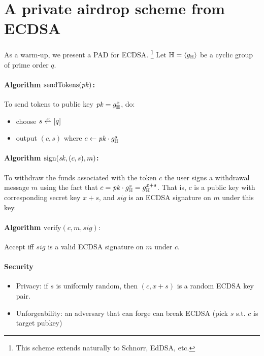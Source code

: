 \section{A private airdrop scheme from ECDSA}\label{sec:dsa}

As a warm-up, we present a PAD for ECDSA.
\unskip\footnote{This scheme extends naturally to Schnorr, EdDSA, etc.}
%
Let $\mathbb H = \langle g_\mathbb{H}\rangle$ be a cyclic group of prime order $q$.

\paragraph{Algorithm $\text{sendTokens}(\mathit{pk})$:} To send tokens to public key $\mathit{pk} = g_\mathbb{H}^x$, do:
\begin{itemize}
\item choose $s \rgets \range{q}$
\item output $(c, s)$ where $c \gets \mathit{pk}\cdot g_\mathbb{H}^s$
\end{itemize}


\paragraph{Algorithm $\text{sign}(\mathit{sk}, (c, s), m)$:}
To withdraw the funds associated with the token $c$ the user signs a
    withdrawal message $m$ using the fact that
$c = \mathit{pk}\cdot g_\mathbb{H}^s = g_\mathbb{H}^{x+s}$.
%
That is, $c$ is a public key with corresponding secret key $x + s$, and
    $\mathit{sig}$ is an ECDSA signature on $m$ under this key.

\paragraph{Algorithm $\text{verify}(c, m, \mathit{sig}):$}
Accept iff $\mathit{sig}$ is a valid ECDSA signature on $m$ under $c$.


\paragraph{Security}
\begin{itemize}
\item Privacy: if $s$ is uniformly random, then $(c, x+s)$ is a random ECDSA key pair.

\item Unforgeability: an adversary that can forge can break ECDSA (pick $s$ s.t. $c$ is target pubkey)
\end{itemize}
